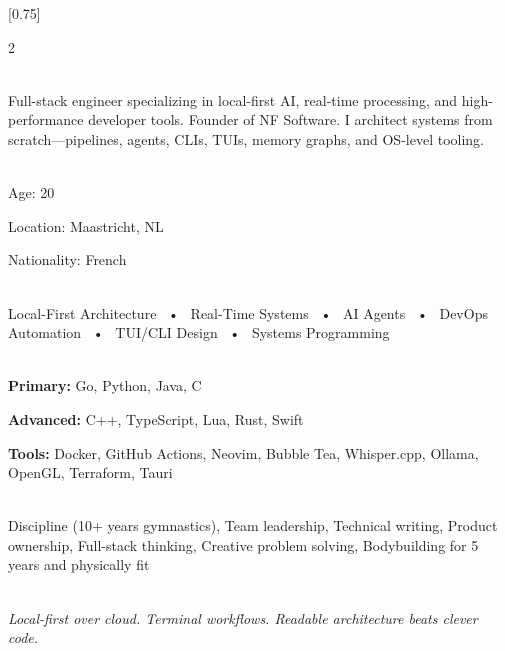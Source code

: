 \documentclass[lighthipster]{simplehipstercv}
\begin{document}
\setlength{\columnsep}{1.5cm}
[0.75]
\begin{paracol}{2}

\paracolbackgroundoptions

\footnotesize
{\setasidefontcolour
\flushleft

\vspace{1em}

\\[0.5em]

{\footnotesize
Full-stack engineer specializing in local-first AI, real-time processing, and high-performance developer tools. Founder of NF Software. I architect systems from scratch—pipelines, agents, CLIs, TUIs, memory graphs, and OS-level tooling.}
\bigskip

 \\[0.5em]
Age: 20

Location: Maastricht, NL

Nationality: French

\bigskip

 \\[0.5em]

Local-First Architecture ~•~
Real-Time Systems ~•~
AI Agents ~•~
DevOps Automation ~•~
TUI/CLI Design ~•~
Systems Programming

\bigskip

\\[0.5em]

\textbf{Primary:}
Go, Python, Java, C

\textbf{Advanced:}
C++, TypeScript, Lua, Rust, Swift

\textbf{Tools:}
Docker, GitHub Actions, Neovim, Bubble Tea, Whisper.cpp, Ollama, OpenGL, Terraform, Tauri

\bigskip

\\[0.5em]

Discipline (10+ years gymnastics), Team leadership, Technical writing, Product ownership, Full-stack thinking, Creative problem solving, Bodybuilding for 5 years and physically fit

\bigskip

\\[0.5em]

{\footnotesize\textit{Local-first over cloud. Terminal workflows. Readable architecture beats clever code.}}

}
\end{paracol}
\end{document}
